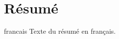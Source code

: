 \chapter*{Résumé}                      %

\begin{otherlanguage*}{francais}
  Texte du résumé en français.
\end{otherlanguage*}
